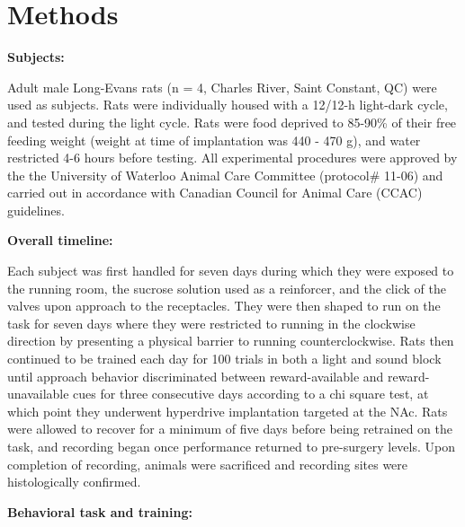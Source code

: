 \documentclass[11pt]{article}
\begin{document}
\section*{Methods}

{\bf Subjects:}

Adult male Long-Evans rats (n = 4, Charles River, Saint Constant, QC) were used as subjects. Rats were individually housed with a 12/12-h light-dark cycle, and tested during the light cycle. Rats were food deprived to 85-90\% of their free feeding weight (weight at time of implantation was 440 - 470 g), and water restricted 4-6 hours before testing. All experimental procedures were approved by the the University of Waterloo Animal Care Committee (protocol\# 11-06) and carried out in accordance with Canadian Council for Animal Care (CCAC) guidelines.

{\bf Overall timeline:}

Each subject was first handled for seven days during which they were exposed to the running room, the sucrose solution used as a reinforcer, and the click of the valves upon approach to the receptacles. They were then shaped to run on the task for seven days where they were restricted to running in the clockwise direction by presenting a physical barrier to running counterclockwise. Rats then continued to be trained each day for 100 trials in both a light and sound block until approach behavior discriminated between reward-available and reward-unavailable cues for three consecutive days according to a chi square test, at which point they underwent hyperdrive implantation targeted at the NAc. Rats were allowed to recover for a minimum of five days before being retrained on the task, and recording began once performance returned to pre-surgery levels. Upon completion of recording, animals were sacrificed and recording sites were histologically confirmed.

{\bf Behavioral task and training:}
\end{document}
